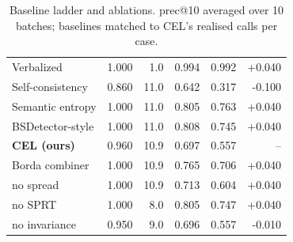 \begin{table}[t]
\begin{tabular}{lrrrrr}
Verbalized & 1.000 & 1.0 & 0.994 & 0.992 & +0.040 \\
Self-consistency & 0.860 & 11.0 & 0.642 & 0.317 & -0.100 \\
Semantic entropy & 1.000 & 11.0 & 0.805 & 0.763 & +0.040 \\
BSDetector-style & 1.000 & 11.0 & 0.808 & 0.745 & +0.040 \\
\textbf{CEL (ours)} & 0.960 & 10.9 & 0.697 & 0.557 & -- \\
\quad Borda combiner & 1.000 & 10.9 & 0.765 & 0.706 & +0.040 \\
\quad no spread & 1.000 & 10.9 & 0.713 & 0.604 & +0.040 \\
\quad no SPRT & 1.000 & 8.0 & 0.805 & 0.747 & +0.040 \\
\quad no invariance & 0.950 & 9.0 & 0.696 & 0.557 & -0.010 \\
\bottomrule
\end{tabular}
\caption{Baseline ladder and ablations. prec@10 averaged over 10 batches; baselines matched to CEL's realised calls per case.}
\label{tab:main}
\end{table}
